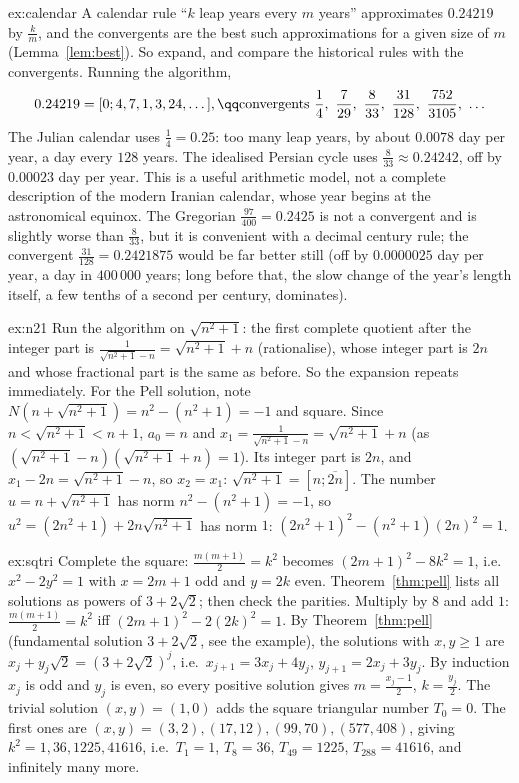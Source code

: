\begin{solution}{ex:calendar}
\idea A calendar rule ``$k$ leap years every $m$ years'' approximates $0.24219$ by $\frac km$, and the convergents are the best such approximations for a given size of $m$ (Lemma~\ref{lem:best}). So expand, and compare the historical rules with the convergents.
\writeup Running the algorithm,
\[\begin{gathered}0.24219=[0;4,7,1,3,24,\dots],\qq\text{convergents }\frac14,\ \frac7{29},\ \frac8{33},\ \frac{31}{128},\ \frac{752}{3105},\ \dots\end{gathered}\]
The Julian calendar uses $\frac14=0.25$: too many leap years, by about $0.0078$ day per year, a day every $128$ years. The idealised Persian cycle uses $\frac8{33}\approx0.24242$, off by $0.00023$ day per year. This is a useful arithmetic model, not a complete description of the modern Iranian calendar, whose year begins at the astronomical equinox. The Gregorian $\frac{97}{400}=0.2425$ is not a convergent and is slightly worse than $\frac8{33}$, but it is convenient with a decimal century rule; the convergent $\frac{31}{128}=0.2421875$ would be far better still (off by $0.0000025$ day per year, a day in $400\,000$ years; long before that, the slow change of the year's length itself, a few tenths of a second per century, dominates).
\end{solution}

\begin{solution}{ex:n21}
\idea Run the algorithm on $\sqrt{n^2+1}$: the first complete quotient after the integer part is $\frac1{\sqrt{n^2+1}-n}=\sqrt{n^2+1}+n$ (rationalise), whose integer part is $2n$ and whose fractional part is the same as before. So the expansion repeats immediately. For the Pell solution, note $N(n+\sqrt{n^2+1})=n^2-(n^2+1)=-1$ and square.
\writeup Since $n<\sqrt{n^2+1}<n+1$, $a_0=n$ and $x_1=\frac1{\sqrt{n^2+1}-n}=\sqrt{n^2+1}+n$ (as $(\sqrt{n^2+1}-n)(\sqrt{n^2+1}+n)=1$). Its integer part is $2n$, and $x_1-2n=\sqrt{n^2+1}-n$, so $x_2=x_1$: $\sqrt{n^2+1}=[n;\overline{2n}]$. The number $u=n+\sqrt{n^2+1}$ has norm $n^2-(n^2+1)=-1$, so $u^2=(2n^2+1)+2n\sqrt{n^2+1}$ has norm $1$: $(2n^2+1)^2-(n^2+1)(2n)^2=1$.
\end{solution}

\begin{solution}{ex:sqtri}
\idea Complete the square: $\frac{m(m+1)}2=k^2$ becomes $(2m+1)^2-8k^2=1$, i.e.\ $x^2-2y^2=1$ with $x=2m+1$ odd and $y=2k$ even. Theorem~\ref{thm:pell} lists all solutions as powers of $3+2\sqrt2$; then check the parities.
\writeup Multiply by $8$ and add $1$: $\frac{m(m+1)}2=k^2$ iff $(2m+1)^2-2(2k)^2=1$. By Theorem~\ref{thm:pell} (fundamental solution $3+2\sqrt2$, see the example), the solutions with $x,y\ge1$ are $x_j+y_j\sqrt2=(3+2\sqrt2)^j$, i.e.\ $x_{j+1}=3x_j+4y_j$, $y_{j+1}=2x_j+3y_j$. By induction $x_j$ is odd and $y_j$ is even, so every positive solution gives $m=\frac{x_j-1}2$, $k=\frac{y_j}2$. The trivial solution $(x,y)=(1,0)$ adds the square triangular number $T_0=0$. The first ones are $(x,y)=(3,2),(17,12),(99,70),(577,408)$, giving $k^2=1,36,1225,41616$, i.e.\ $T_1=1$, $T_8=36$, $T_{49}=1225$, $T_{288}=41616$, and infinitely many more.
\end{solution}

